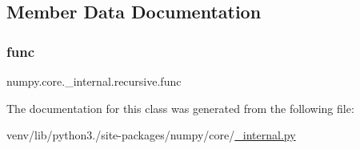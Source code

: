 \subsection{Member Data Documentation}
\mbox{\label{classnumpy_1_1core_1_1__internal_1_1recursive_a54dcb8bc12265c15f94bbc3daa29cf21}} 
\subsubsection{\texorpdfstring{func}{func}}
{\footnotesize\ttfamily numpy.\+core.\+\_\+internal.\+recursive.\+func}



The documentation for this class was generated from the following file\+:\begin{DoxyCompactItemize}
\item 
venv/lib/python3./site-\/packages/numpy/core/\hyperlink{__internal_8py}{\+\_\+internal.\+py}\end{DoxyCompactItemize}
